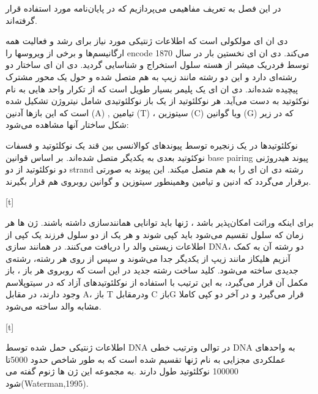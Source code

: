

در این فصل به تعریف مفاهیمی می‌پردازیم که در پایان‌نامه مورد استفاده قرار گرفته‌اند.




دی ان ای مولکولی است که اطلاعات ژنتیکی مورد نیاز برای رشد و فعالیت همه ارگانیسم‌ها و برخی از ویروسها را encode می‌کند.
 دی ان ای نخستین بار در سال 1870 توسط فردریک میشر از هسته سلول استخراج و شناسایی گردید. دی ان ای ساختار دو رشته‌ای دارد و این دو رشته مانند زیپ به هم متصل شده و حول یک محور مشترک پیچیده شده‌اند.
دی ان ای یک پلیمر بسیار طویل است که از تکرار واحد هایی به نام نوکئوتید به دست می‌آید. هر نوکلئوتید از یک باز نوکلئوتیدی شامل نیتروژن تشکیل شده است که این بازها آدنین (A) , تیامین (T) ، سیتوزین (C) ویا گوانین (G) که در زیر شکل ساختار آنها مشاهده می‌شود:


نوکلئوتیدها در یک زنجیره توسط پیوندهای کوالانسی بین قند یک نوکلئوتید و فسفات نوکئوتید بعدی به یکدیگر متصل شده‌اند. بر اساس قوانین base pairing پیوند هیدروژنی دو نوکلئوتید از دو strand رشته دی ان ای را به هم متصل میکند. این پیوند به صورتی برقرار می‌گردد که ادنین و تیامین وهمینطور سیتوزین و گوانین روبروی هم قرار بگیرند.


[t]



برای اینکه وراثت امکان‌پذیر باشد ، ژنها باید توانایی همانند‌سازی داشته باشند.	ژن ها هر زمان که سلول تقسیم می‌شود باید کپی شوند و هر یک از دو سلول فرزند یک کپی از اطلاعات زیستی والد را دریافت می‌کنند.	
 در همانند سازی DNA، دو رشته آن به کمک آنزیم هلیکاز مانند زیپ از یکدیگر جدا می‌شوند و سپس از روی هر رشته، رشته‌ی جدیدی ساخته می‌شود. کلید ساخت رشته جدید در این است که روبروی هر باز ، باز مکمل آن قرار می‌گیرد، به این ترتیب با استفاده از نوکلئوتیدهای آزاد که در سیتوپلاسم وجود دارند‌، در مقابل A، باز T ودرمقابل C بازG قرار می‌گیرد و در آخر دو کپی کاملا مشابه والد ساخته می‌شود.
 

[t]

 
 
 
 اطلاعات ژنتیکی حمل شده توسط DNA در توالی وترتیب خطی DNA به واحد‌های عملکردی مجزایی به نام ژنها تقسیم شده است که به طور شاخص حدود 5000تا 100000 نوکلئوتید طول دارند .به مجموعه این ژن ها ژنوم گفته می شود(Waterman,1995).

